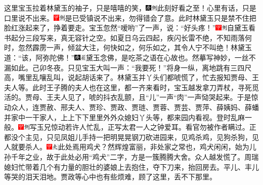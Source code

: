 这里宝玉拉着林黛玉的袖子，只是嘻嘻的笑，{\includegraphics[width=3mm]{../Images/00004}\includegraphics[width=3mm]{../Images/00011}\footnotesize \kaishu 此刻好看之至！}心里有话，只是口里说不出来。{\includegraphics[width=3mm]{../Images/00002}\includegraphics[width=3mm]{../Images/00011}\footnotesize \kaishu 是已受镇说不出来，勿得错会了意。}此时林黛玉只是禁不住把脸红涨起来了，挣着要走。宝玉忽然``嗳哟''了一声，说：``好头疼！''{\includegraphics[width=3mm]{../Images/00002}\includegraphics[width=3mm]{../Images/00011}\footnotesize \kaishu 自黛玉看书起分三段写来，真无容针之空。如夏日乌云四起，疾闪长雷不绝，不知雨落何时，忽然霹雳一声，倾盆大注，何快如之，何乐如之，其令人宁不叫绝！}林黛玉道：``该，阿弥陀佛！''{\includegraphics[width=3mm]{../Images/00004}\includegraphics[width=3mm]{../Images/00010}\footnotesize \kaishu 黛玉念佛，是吃茶之语在心故也。然摹写神妙，一丝不漏如此。己卯冬夜。}只见宝玉大叫一声：``我要死！''将身一纵，离地跳有三四尺高，嘴里乱嚷乱叫，说起胡话来了。林黛玉并丫头们都唬慌了，忙去报知贾母、王夫人等。此时王子腾的夫人也在这里，都一齐来看时，宝玉越发拿刀弄杖，寻死觅活的。贾母、王夫人见了，唬的抖衣乱颤，且``儿''一声``肉''一声恸哭起来。于是惊动众人，连贾赦、邢夫人、贾珍、贾政、贾琏、贾蓉、贾芸、贾萍、薛姨妈、薛蟠并家中一干家人，上上下下里里外外众媳妇丫头等，都来园内看视。登时乱麻一般。{\includegraphics[width=3mm]{../Images/00002}\includegraphics[width=3mm]{../Images/00011}\footnotesize \kaishu 写玉兄惊动若许人忙乱，正写太君一人之钟爱耳。看官勿被作者瞒过。}正都没个主见，只见凤姐儿手持一把明晃晃钢刀砍进园来，见鸡杀鸡，见狗杀狗，见人就要杀人。{\includegraphics[width=3mm]{../Images/00002}\includegraphics[width=3mm]{../Images/00012}\footnotesize \kaishu 此处焉用鸡犬？然辉煌富丽，非处家之常也，鸡犬闲闲，始为儿孙千年之业，故于此处必用``鸡犬''二字，方是一簇腾腾大舍。}众人越发慌了。周瑞媳妇忙带着几个有力量的胆壮的婆娘上去抱住，夺下刀来，抬回房去。平儿、丰儿等哭的泪天泪地。贾政等心中也有些烦难，顾了这里，丢不下那里。

